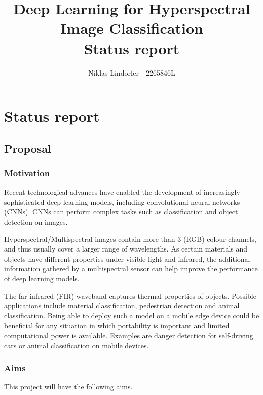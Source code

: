 \documentclass[11pt]{article}
\title{
    Deep Learning for Hyperspectral Image Classification \\
    \large{Status report}
}
\author{Niklas Lindorfer - 2265846L}
\begin{document}
\maketitle


\section{Status report}

\subsection{Proposal}\label{proposal}

\subsubsection{Motivation}\label{motivation}

Recent technological advances have enabled the development of increasingly sophisticated deep learning models, including convolutional neural networks (CNNs). 
CNNs can perform complex tasks such as classification and object detection on images.

Hyperspectral/Multispectral images contain more than 3 (RGB) colour channels, and thus usually cover a larger range of wavelengths. As certain materials and objects have different properties under visible light and infrared, the additional information gathered by a multispectral sensor can help improve the performance of deep learning models.

The far-infrared (FIR) waveband captures thermal properties of objects. Possible applications include material classification, pedestrian detection and animal classification. Being able to deploy such a model on a mobile edge device could be beneficial for any situation in which portability is important and limited computational power is available. Examples are danger detection for self-driving cars or animal classification on mobile devices.

\subsubsection{Aims}\label{aims}

This project will have the following aims.
\end{document}
